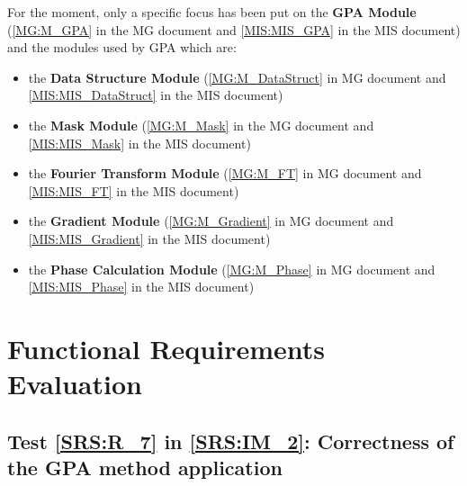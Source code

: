 \documentclass[12pt, titlepage]{article}
\begin{document}
For the moment, only a specific focus has been put on the \textbf{GPA Module} 
(\cref{MG:M_GPA} in the  MG document and \cref{MIS:MIS_GPA} in the MIS document) 
and the modules used by GPA which are:
\begin{itemize}
\item the \textbf{Data Structure Module} (\cref{MG:M_DataStruct} in MG document 
and \cref{MIS:MIS_DataStruct} in the MIS document)
\item the \textbf{Mask Module} (\cref{MG:M_Mask} in the MG document and 
\cref{MIS:MIS_Mask} in the MIS document)
\item the \textbf{Fourier Transform Module} (\cref{MG:M_FT} in MG document and 
\cref{MIS:MIS_FT} in the MIS document)
\item the \textbf{Gradient Module} (\cref{MG:M_Gradient} in MG document and 
\cref{MIS:MIS_Gradient} in the MIS document)
\item the \textbf{Phase Calculation Module} (\cref{MG:M_Phase} in MG document 
and \cref{MIS:MIS_Phase} in the MIS document)
\end{itemize}

\section{Functional Requirements Evaluation}

\subsection{\textbf{Test \cref{SRS:R_7} in \cref{SRS:IM_2}}: Correctness of the 
GPA method application}
\end{document}
